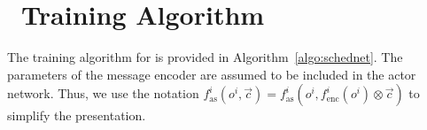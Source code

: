 \section{\sched~Training Algorithm}

The training algorithm for {\sched} is provided in Algorithm~\ref{algo:schednet}. The parameters of the message encoder are assumed to be included in the actor network. Thus, we use the notation $f^i_\text{as}(o^i, \vec{c}) = f^i_\text{as}(o^i, f^i_\text{enc}(o^i) \otimes \vec{c})$ to simplify the presentation.




